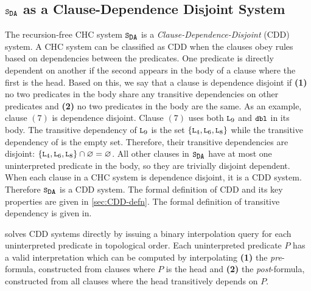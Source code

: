\subsection{$\mcchc$ as a Clause-Dependence Disjoint System}
\label{sec:solve-ex}
The recursion-free CHC system $\mcchc$ is a
\emph{Clause-Dependence-Disjoint} (CDD) system.
A CHC system can be classified as CDD when the clauses obey
rules based on dependencies between the predicates.
%
One predicate is directly dependent on another if the second appears
in the body of a clause where the first is the head.
%
Based on this, we say that a clause is dependence disjoint if
\textbf{(1)} no two predicates in the body share any transitive
dependencies on other predicates and \textbf{(2)} no two predicates in
the body are the same.
As an example, clause $(7)$ is dependence disjoint. Clause $(7)$ uses
both $\cc{L}_9$ and $\cc{dbl}$ in its body.
%
The transitive dependency of $\cc{L}_9$ is the set
$\{\cc{L}_4,\cc{L}_6,\cc{L}_8\}$ while the transitive dependency of
 is the empty set.
%
Therefore, their transitive dependencies are disjoint:
$\{\cc{L}_4,\cc{L}_6,\cc{L}_8\} \cap \varnothing = \varnothing$.
%
All other clauses in $\mcchc$ have at most one uninterpreted predicate
in the body, so they are trivially disjoint dependent.
%
When each clause in a CHC system is dependence disjoint, it is a CDD
system. Therefore $\mcchc$ is a CDD system.
%
%
The formal definition of CDD and its key properties are given in
\autoref{sec:CDD-defn}.
The formal definition of transitive dependency is given in.
%

\sys solves CDD systems directly by issuing a binary interpolation
query for each uninterpreted predicate in topological order.
%
Each uninterpreted predicate $P$ has a valid interpretation which can
be computed by interpolating
\textbf{(1)} the \emph{pre}-formula, constructed from clauses where
$P$ is the head and
\textbf{(2)} the \emph{post}-formula, constructed from
all clauses where the head transitively depends on $P$.
%


